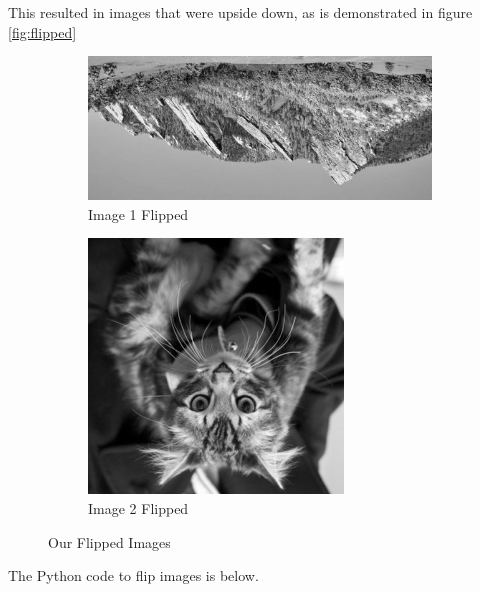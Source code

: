 This resulted in images that were upside down, as is demonstrated in figure \eqref{fig:flipped}

    \begin{figure}[h!]
        \centering
        \begin{subfigure}{0.6\textwidth}
            \includegraphics[scale=0.5]{./img/flip1.png}
            \caption{Image 1 Flipped}
        \end{subfigure}
        \begin{subfigure}{0.3\textwidth}
            \includegraphics[scale=0.5]{./img/flip2.png}
            \caption{Image 2 Flipped}
        \end{subfigure}
        \caption{Our Flipped Images}
        \label{fig:flipped}
    \end{figure}


The Python code to flip images is below.

        
